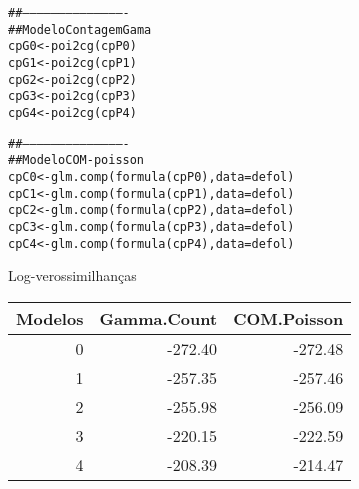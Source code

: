 \documentclass[nohyper, justified, svgnames]{tufte-handout}\usepackage[]{graphicx}\usepackage[]{color}
\makeatletter
\newcommand{\hlcom}[1]{\textcolor[rgb]{0.314,0.439,0.502}{#1}}%
\newcommand{\hlstd}[1]{\textcolor[rgb]{0.878,0.933,0.878}{#1}}%
\newcommand{\hlkwb}[1]{\textcolor[rgb]{0.678,0.847,0.902}{#1}}%
\newcommand{\hlkwc}[1]{\textcolor[rgb]{0.8,0.6,1}{#1}}%
\newcommand{\hlkwd}[1]{\textcolor[rgb]{1,0.6,0.6}{#1}}%
\newenvironment{kframe}{%
 \def\at@end@of@kframe{}%
 \ifinner\ifhmode%
  \def\at@end@of@kframe{\end{minipage}}%
  \begin{minipage}{\columnwidth}%
 \fi\fi%
 \def\FrameCommand##1{\hskip\@totalleftmargin \hskip-\fboxsep
 \colorbox{shadecolor}{##1}\hskip-\fboxsep
     \hskip-\linewidth \hskip-\@totalleftmargin \hskip\columnwidth}%
 \MakeFramed {\advance\hsize-\width
   \@totalleftmargin\z@ \linewidth\hsize
   \@setminipage}}%
 {\par\unskip\endMakeFramed%
 \at@end@of@kframe}
\newenvironment{knitrout}{}{} %
\makeatother
\begin{document}
\begin{knitrout}
\begin{kframe}
\begin{alltt}
\hlcom{##-------------------------------------------}
\hlcom{## Modelo Contagem Gama}
\hlstd{cpG0} \hlkwb{<-} \hlkwd{poi2cg}\hlstd{(cpP0)}
\hlstd{cpG1} \hlkwb{<-} \hlkwd{poi2cg}\hlstd{(cpP1)}
\hlstd{cpG2} \hlkwb{<-} \hlkwd{poi2cg}\hlstd{(cpP2)}
\hlstd{cpG3} \hlkwb{<-} \hlkwd{poi2cg}\hlstd{(cpP3)}
\hlstd{cpG4} \hlkwb{<-} \hlkwd{poi2cg}\hlstd{(cpP4)}

\hlcom{##-------------------------------------------}
\hlcom{## Modelo COM-poisson}
\hlstd{cpC0} \hlkwb{<-} \hlkwd{glm.comp}\hlstd{(}\hlkwd{formula}\hlstd{(cpP0),} \hlkwc{data} \hlstd{= defol)}
\hlstd{cpC1} \hlkwb{<-} \hlkwd{glm.comp}\hlstd{(}\hlkwd{formula}\hlstd{(cpP1),} \hlkwc{data} \hlstd{= defol)}
\hlstd{cpC2} \hlkwb{<-} \hlkwd{glm.comp}\hlstd{(}\hlkwd{formula}\hlstd{(cpP2),} \hlkwc{data} \hlstd{= defol)}
\hlstd{cpC3} \hlkwb{<-} \hlkwd{glm.comp}\hlstd{(}\hlkwd{formula}\hlstd{(cpP3),} \hlkwc{data} \hlstd{= defol)}
\hlstd{cpC4} \hlkwb{<-} \hlkwd{glm.comp}\hlstd{(}\hlkwd{formula}\hlstd{(cpP4),} \hlkwc{data} \hlstd{= defol)}
\end{alltt}
\end{kframe}
\end{knitrout}



\begin{margintable}
\caption{Log-verossimilhanças} 
\label{logliks}
\begin{tabular}{rrr}
  \hline
Modelos & Gamma.Count & COM.Poisson \\ 
  \hline
  0 & -272.40 & -272.48 \\ 
    1 & -257.35 & -257.46 \\ 
    2 & -255.98 & -256.09 \\ 
    3 & -220.15 & -222.59 \\ 
    4 & -208.39 & -214.47 \\ 
   \hline
\end{tabular}
\end{margintable}
\end{document}
